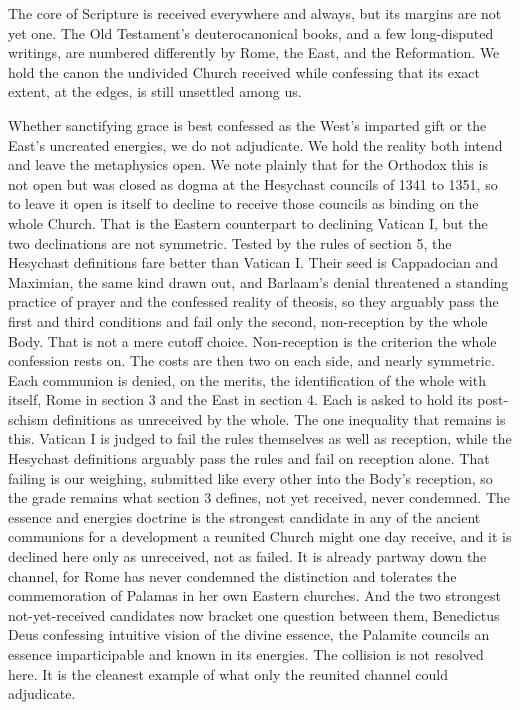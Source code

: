 \documentclass[11pt,twoside]{article}
\newcommand{\unit}[1]{\needspace{3\baselineskip}\par\medskip{\normalfont\bfseries\color{subhead}#1}\par\nobreak\smallskip}
\begin{document}
\unit{The edges of the canon.}
The core of Scripture is received everywhere and always, but its margins are not yet one. The Old Testament's deuterocanonical books, and a few long-disputed writings, are numbered differently by Rome, the East, and the Reformation. We hold the canon the undivided Church received while confessing that its exact extent, at the edges, is still unsettled among us.

\unit{The nature of grace.}
Whether sanctifying grace is best confessed as the West's imparted gift or the East's uncreated energies, we do not adjudicate. We hold the reality both intend and leave the metaphysics open. We note plainly that for the Orthodox this is not open but was closed as dogma at the Hesychast councils of 1341 to 1351, so to leave it open is itself to decline to receive those councils as binding on the whole Church. That is the Eastern counterpart to declining Vatican I, but the two declinations are not symmetric. Tested by the rules of section 5, the Hesychast definitions fare better than Vatican I. Their seed is Cappadocian and Maximian, the same kind drawn out, and Barlaam's denial threatened a standing practice of prayer and the confessed reality of theosis, so they arguably pass the first and third conditions and fail only the second, non-reception by the whole Body. That is not a mere cutoff choice. Non-reception is the criterion the whole confession rests on. The costs are then two on each side, and nearly symmetric. Each communion is denied, on the merits, the identification of the whole with itself, Rome in section 3 and the East in section 4. Each is asked to hold its post-schism definitions as unreceived by the whole. The one inequality that remains is this. Vatican I is judged to fail the rules themselves as well as reception, while the Hesychast definitions arguably pass the rules and fail on reception alone. That failing is our weighing, submitted like every other into the Body's reception, so the grade remains what section 3 defines, not yet received, never condemned. The essence and energies doctrine is the strongest candidate in any of the ancient communions for a development a reunited Church might one day receive, and it is declined here only as unreceived, not as failed. It is already partway down the channel, for Rome has never condemned the distinction and tolerates the commemoration of Palamas in her own Eastern churches. And the two strongest not-yet-received candidates now bracket one question between them, Benedictus Deus confessing intuitive vision of the divine essence, the Palamite councils an essence imparticipable and known in its energies. The collision is not resolved here. It is the cleanest example of what only the reunited channel could adjudicate.
\end{document}
